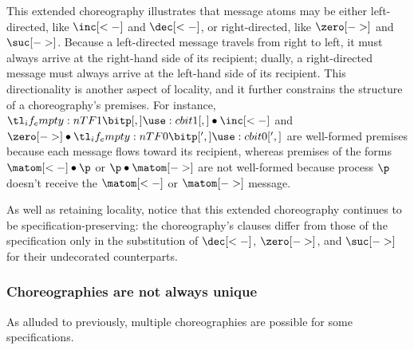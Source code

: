 \documentclass[
  class=../hdeyoung-proposal,
  crop=false
]{standalone}
\begin{document}
This extended choreography illustrates that message atoms may be either left-directed, like $\inc[<-]$ and $\dec[<-]$, or right-directed, like $\zero[->]$ and $\suc[->]$.
% 
Because a left-directed message travels from right to left, it must always arrive at the right-hand side of its recipient; dually, a right-directed message must always arrive at the left-hand side of its recipient.
This directionality is another aspect of locality, and it further constrains the structure of a choreography's premises.  For instance, $\bit{1} \fuse \inc[<-]$ and $\zero[->] \fuse \bit[']{0}$ are well-formed premises because each message flows toward its recipient, whereas premises of the forms $\matom[<-] \fuse \p$ or $\p \fuse \matom[->]$ are not well-formed because process $\p$ doesn't receive the $\matom[<-]$ or $\matom[->]$ message.

As well as retaining locality, notice that this extended choreography continues to be specification-preserving:
the choreography's clauses differ from those of the specification only in the substitution of $\dec[<-]$, $\zero[->]$, and $\suc[->]$ for their undecorated counterparts.


\subsubsection{Choreographies are not always unique}\label{sec:mult-chor-are}

As alluded to previously, multiple choreographies are possible for some specifications.
\end{document}
